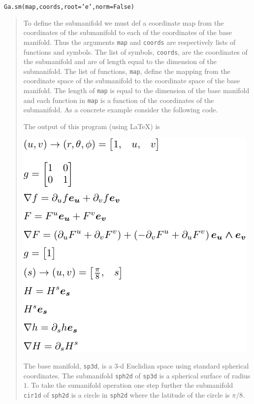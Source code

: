 \documentclass[12pt,twoside,openright]{memoir}
\newcommand{\T}[1]{\texttt{#1}}
\newcommand{\includecode}[1]{}
\begin{document}
\T{Ga.sm(map,coords,root='e',norm=False)}
\begin{quote}
	To define the submanifold we must def a coordinate map from the coordinates of the submanifold to
	each of the coordinates of the base manifold.  Thus the arguments \T{map} and \T{coords} are 
	respectively lists of functions and symbols.  The list of symbols, \T{coords}, are the coordinates of the 
	submanifold and are of length equal to the dimension of the submanifold.  The list of functions, \T{map},
	define the mapping from the coordinate space of the submanifold to the coordinate space of the 
	base manifold.  The length of \T{map} is equal to the dimension of the base manifold and each function in
	\T{map} is a function of the coordinates of the submanifold. As a concrete example consider the
	following code.
	\includecode{python/submanifold.py}
	The output of this program (using \LaTeX) is
	\begin{center}
	\includegraphics[scale=0.9]{python/submanifold.pdf}	
	\end{center} 	

	The base manifold, \T{sp3d}, is a 3-d Euclidian space using standard spherical coordinates. The submanifold
	\T{sph2d} of \T{sp3d} is a spherical surface of radius $1$.  To take the sumanifold operation one step further
	the submanifold \T{cir1d} of \T{sph2d} is a circle in \T{sph2d} where the latitude of the circle is $\pi/8$.
	

\end{quote}
\end{document}
